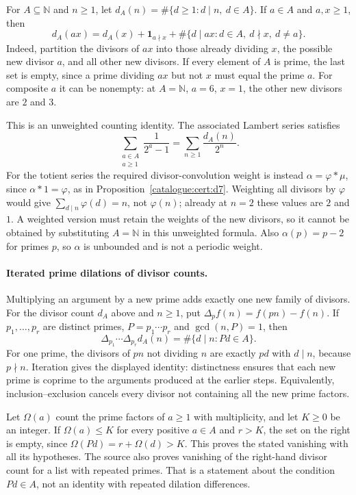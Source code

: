 \begin{prop}\label{catalogue:mob:f1}
For $A\subseteq\mathbb N$ and $n\ge1$, let
$d_A(n)=\#\{d\ge1:d\mid n,\ d\in A\}$. If $a\in A$ and $a,x\ge1$, then
\[
 d_A(ax)=d_A(x)+\mathbf 1_{a\nmid x}
       +\#\{d\mid ax:d\in A,\ d\nmid x,\ d\ne a\}.
\]
Indeed, partition the divisors of $ax$ into those already dividing $x$,
the possible new divisor $a$, and all other new divisors. If every element
of $A$ is prime, the last set is empty, since a prime dividing $ax$ but
not $x$ must equal the prime $a$. For composite $a$ it can be nonempty:
at $A=\mathbb N$, $a=6$, $x=1$, the other new divisors are $2$ and $3$.

This is an unweighted counting identity. The associated Lambert series
satisfies
\[
 \sum_{\substack{a\in A\\a\ge1}}\frac1{2^a-1}
 =\sum_{n\ge1}\frac{d_A(n)}{2^n}.
\]
For the totient series the required divisor-convolution weight is instead
$\alpha=\varphi*\mu$, since $\alpha*1=\varphi$, as in
Proposition~\ref{catalogue:cert:d7}. Weighting all divisors by $\varphi$
would give $\sum_{d\mid n}\varphi(d)=n$, not $\varphi(n)$; already at
$n=2$ these values are $2$ and $1$. A weighted version must retain the
weights of the new divisors, so it cannot be obtained by substituting
$A=\mathbb N$ in this unweighted formula. Also $\alpha(p)=p-2$ for primes
$p$, so $\alpha$ is unbounded and is not a periodic weight.
\end{prop}

\paragraph{Iterated prime dilations of divisor counts.}
Multiplying an argument by a new prime adds exactly one new family of
divisors. For the divisor count $d_A$ above and $n\ge1$, put
$\Delta_p f(n)=f(pn)-f(n)$. If $p_1,\ldots,p_r$ are distinct primes,
$P=p_1\cdots p_r$ and $\gcd(n,P)=1$, then
\[
 \Delta_{p_1}\cdots\Delta_{p_r}d_A(n)
       =\#\{d\mid n:Pd\in A\}.
\]
For one prime, the divisors of $pn$ not dividing $n$ are exactly $pd$
with $d\mid n$, because $p\nmid n$. Iteration gives the displayed
identity: distinctness ensures that each new prime is coprime to the
arguments produced at the earlier steps. Equivalently, inclusion--exclusion
cancels every divisor not containing all the new prime factors.

Let $\Omega(a)$ count the prime factors of $a\ge1$ with multiplicity,
and let $K\ge0$ be an integer. If $\Omega(a)\le K$ for every positive $a\in A$ and $r>K$, the set on
the right is empty, since $\Omega(Pd)=r+\Omega(d)>K$.
This proves the stated vanishing with all its hypotheses.
The source also proves vanishing of the right-hand divisor count for a
list with repeated primes. That is a statement about the condition
$Pd\in A$, not an identity with repeated dilation differences.

